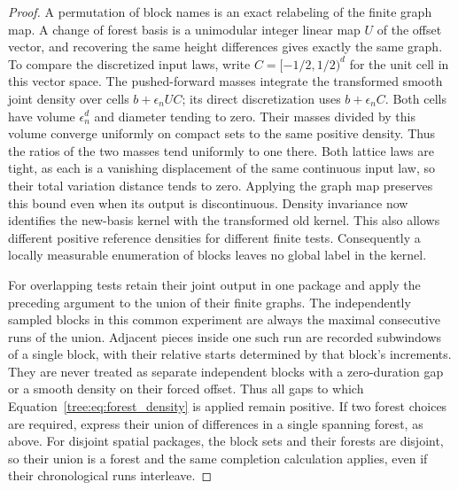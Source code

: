 \begin{proof}
A permutation of block names is an exact relabeling of the finite
graph map. A change of forest basis is a unimodular integer linear
map $U$ of the offset vector, and recovering the same height
differences gives exactly the same graph. To compare the discretized
input laws, write $C=[-1/2,1/2)^d$ for the unit cell in this vector
space. The pushed-forward masses integrate the transformed smooth
joint density over cells $b+\epsilon_n UC$; its direct discretization
uses $b+\epsilon_n C$. Both cells have volume $\epsilon_n^d$ and
diameter tending to zero. Their masses divided by this volume
converge uniformly on compact sets to the same positive density.
Thus the ratios of the two masses tend uniformly to one there.
Both lattice laws are tight, as each is a vanishing displacement
of the same continuous input law, so their total variation distance
tends to zero. Applying the graph map preserves this bound even
when its output is discontinuous. Density invariance now identifies
the new-basis kernel with the transformed old kernel. This also
allows different positive reference densities for different finite
tests. Consequently a locally measurable enumeration of blocks
leaves no global label in the kernel.

For overlapping tests retain their joint output in one package and
apply the preceding argument to the union of their finite graphs.
The independently sampled blocks in this common experiment are always
the maximal consecutive runs of the union.  Adjacent pieces inside
one such run are recorded subwindows of a single block, with their
relative starts determined by that block's increments.  They are
never treated as separate independent blocks with a zero-duration
gap or a smooth density on their forced offset.  Thus all gaps to
which Equation~\eqref{tree:eq:forest_density} is applied remain positive.
If two forest choices are required, express their union of differences
in a single spanning forest, as above.  For disjoint spatial packages,
the block sets and their forests are disjoint, so their union is a
forest and the same completion calculation applies, even if their
chronological runs interleave.


\end{proof}
